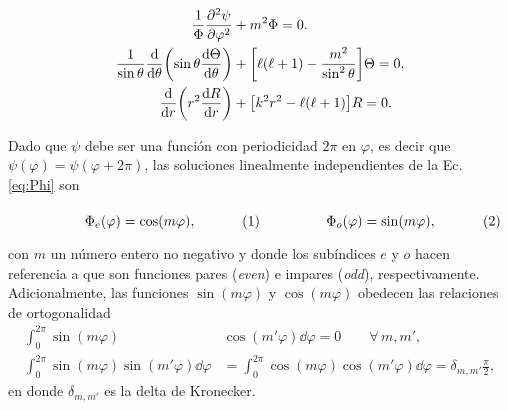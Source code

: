 \begin{align}
\frac{1}{\Phi}\pdv[2]{\psi}{\varphi} &+ m^2 \Phi =0. \label{eq:Phi}\\
\frac{1}{\sin\theta}\dv{\theta}\qty(\sin\theta\dv{\Theta}{\theta}) &+ \qty[\ell(\ell+1)- \frac{m^2}{\sin^2\theta}]\Theta =0,\label{eq:Theta}\\
\dv{r}\qty(r^2\dv{R}{r}) &+ \qty[ k^2 r^2 - \ell (\ell +1)] R =0. \label{eq:R}
\end{align}

Dado que $\psi$ debe ser una función con periodicidad $2\pi$ en $\varphi$, es decir que $\psi(\varphi) = \psi(\varphi+2\pi)$, las soluciones linealmente independientes de la Ec. \eqref{eq:Phi} son

	\begin{subequations}
	\eqhalf{\Phi_e(\varphi) = \cos(m\varphi),}
	\eqhalf{\Phi_o(\varphi) = \sin(m\varphi),} 
	\end{subequations} \vspace{-.5em}
	
\noindent	
con $m$ un número entero no negativo y donde los subíndices $e$ y $o$ hacen referencia a que son funciones pares (\emph{even}) e impares (\emph{odd}), respectivamente. Adicionalmente, las funciones $\sin(m\varphi)$ y $\cos(m\varphi)$ obedecen las relaciones de ortogonalidad
 	\begin{subequations}
	\begin{align}
	\int_0^{2\pi} \sin(m\varphi) &\cos(m' \varphi) \dd\varphi = 0 \qquad \forall\, m,m',\label{seq:ortSinCos}\\
	\int_0^{2\pi} \sin(m\varphi) \sin(m'\varphi)\dd\varphi &=  \int_0^{2\pi} \cos(m\varphi) \cos(m'\varphi)\dd\varphi  = \delta_{m,m'}\frac{\pi}{2},\label{seq:ortCos2}
	\end{align}\label{eq:SinCos}
 	\end{subequations}
en donde $\delta_{m,m'}$ es la delta de Kronecker.


